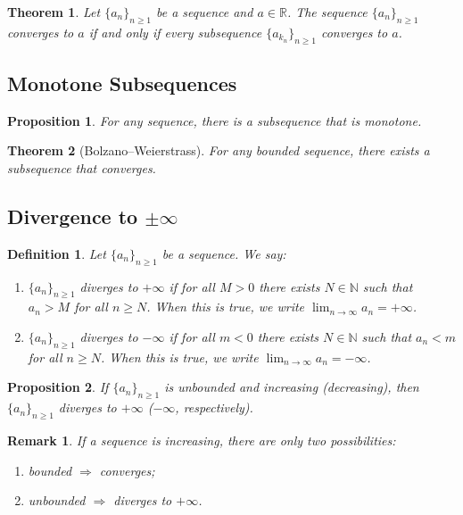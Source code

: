 \documentclass[12pt]{article}
\newtheorem*{remark}{Remark}
\newtheorem{theorem}{Theorem}
\newtheorem{proposition}{Proposition}
\newtheorem{definition}{Definition}
\begin{document}
\begin{theorem}
Let $\{a_n\}_{n\ge 1}$ be a sequence and $a\in\mathbb{R}$. The sequence
$\{a_n\}_{n\ge 1}$ converges to $a$ if and only if every subsequence
$\{a_{k_n}\}_{n\ge 1}$ converges to $a$.
\end{theorem}

\subsection*{Monotone Subsequences}
\begin{proposition}
For any sequence, there is a subsequence that is monotone.
\end{proposition}

\begin{theorem}[Bolzano--Weierstrass]
For any bounded sequence, there exists a subsequence that converges.
\end{theorem}

\subsection*{Divergence to $\pm\infty$}
\begin{definition}
Let $\{a_n\}_{n\ge 1}$ be a sequence. We say:
\begin{enumerate}[label=\textbf{(\arabic*)}]
\item $\{a_n\}_{n\ge 1}$ diverges to $+\infty$ if for all $M>0$ there exists
$N\in\mathbb{N}$ such that $a_n>M$ for all $n\ge N$. When this is true, we write
$\lim_{n\to\infty} a_n=+\infty$.
\item $\{a_n\}_{n\ge 1}$ diverges to $-\infty$ if for all $m<0$ there exists
$N\in\mathbb{N}$ such that $a_n<m$ for all $n\ge N$. When this is true, we write
$\lim_{n\to\infty} a_n=-\infty$.
\end{enumerate}
\end{definition}

\begin{proposition}
If $\{a_n\}_{n\ge 1}$ is unbounded and increasing (decreasing), then
$\{a_n\}_{n\ge 1}$ diverges to $+\infty$ ($-\infty$, respectively).
\end{proposition}

\begin{remark}
If a sequence is increasing, there are only two possibilities:
\begin{enumerate}[label=\textbf{(\arabic*)}]
\item bounded $\Rightarrow$ converges;
\item unbounded $\Rightarrow$ diverges to $+\infty$.
\end{enumerate}
\end{remark}
\end{document}
